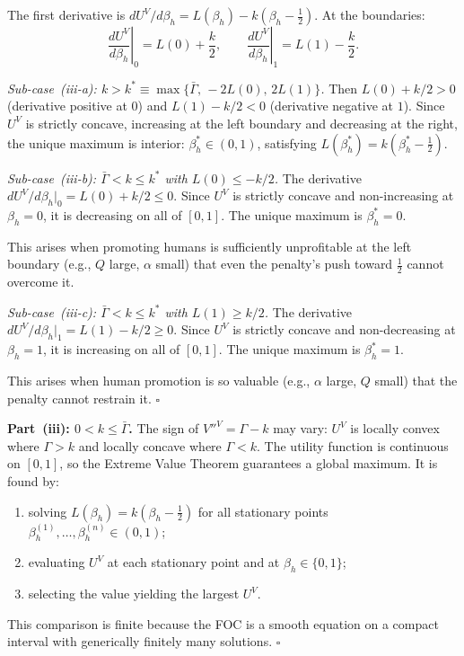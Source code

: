 \documentclass[mnsc,nonblindrev]{informs3_NoOR}
\begin{document}
The first derivative is $dU^V/d\beta_h = L(\beta_h) - k(\beta_h-\frac{1}{2})$. At the boundaries:
\[
\left.\frac{dU^V}{d\beta_h}\right|_0 = L(0)+\frac{k}{2}, \qquad \left.\frac{dU^V}{d\beta_h}\right|_1 = L(1)-\frac{k}{2}.
\]
 
\medskip\noindent\emph{Sub-case~(iii-a): $k > k^* \equiv \max\{\bar\Gamma,\,-2L(0),\,2L(1)\}$.}
Then $L(0)+k/2 > 0$ (derivative positive at $0$) and $L(1)-k/2<0$ (derivative negative at $1$). Since $U^V$ is strictly concave, increasing at the left boundary and decreasing at the right, the unique maximum is interior: $\beta_h^* \in (0,1)$, satisfying $L(\beta_h^*)=k(\beta_h^*-\frac{1}{2})$.
 
\medskip\noindent\emph{Sub-case~(iii-b): $\bar\Gamma < k \leq k^*$ with $L(0) \leq -k/2$.}
The derivative $dU^V/d\beta_h\big|_0 = L(0)+k/2 \leq 0$. Since $U^V$ is strictly concave and non-increasing at $\beta_h=0$, it is decreasing on all of $[0,1]$. The unique maximum is $\beta_h^*=0$.
 
This arises when promoting humans is sufficiently unprofitable at the left boundary (e.g., $Q$ large, $\alpha$ small) that even the penalty's push toward $\frac{1}{2}$ cannot overcome it.
 
\medskip\noindent\emph{Sub-case~(iii-c): $\bar\Gamma < k \leq k^*$ with $L(1) \geq k/2$.}
The derivative $dU^V/d\beta_h\big|_1 = L(1)-k/2 \geq 0$. Since $U^V$ is strictly concave and non-decreasing at $\beta_h=1$, it is increasing on all of $[0,1]$. The unique maximum is $\beta_h^*=1$.
 
This arises when human promotion is so valuable (e.g., $\alpha$ large, $Q$ small) that the penalty cannot restrain it. \hfill$\square$
 
\medskip\noindent\textbf{Part~(iii): $0 < k \leq \bar\Gamma$.}
The sign of $V''^V = \Gamma-k$ may vary: $U^V$ is locally convex where $\Gamma>k$ and locally concave where $\Gamma<k$. The utility function is continuous on $[0,1]$, so the Extreme Value Theorem guarantees a global maximum. It is found by:
\begin{enumerate}
\item solving $L(\beta_h) = k(\beta_h-\frac{1}{2})$ for all stationary points $\beta_h^{(1)},\ldots,\beta_h^{(n)} \in (0,1)$;
\item evaluating $U^V$ at each stationary point and at $\beta_h \in \{0,1\}$;
\item selecting the value yielding the largest $U^V$.
\end{enumerate}
This comparison is finite because the FOC is a smooth equation on a compact interval with generically finitely many solutions. \hfill$\square$
\end{document}
